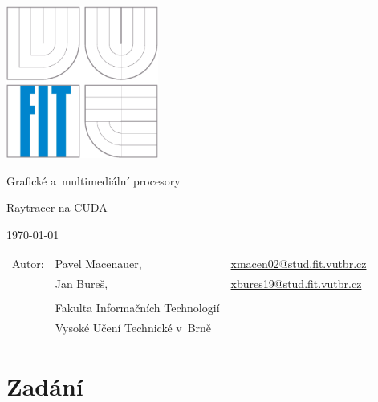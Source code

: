 \documentclass[12pt,a4paper,titlepage,final]{report}
\makeatletter
\newcommand\Course{Grafické a~multimediální procesory}
\newcommand\WorkTitle{Raytracer na CUDA}
\newcommand\AuthorA{Pavel Macenauer}
\newcommand\AuthorB{Jan Bureš}
\newcommand\AuthorAEmail{xmacen02@stud.fit.vutbr.cz}
\newcommand\AuthorBEmail{xbures19@stud.fit.vutbr.cz}
\newcommand\Faculty{Fakulta Informačních Technologií}
\newcommand\School{Vysoké Učení Technické v~Brně}
\makeatother
\begin{document}
	\begin{titlepage}
	\begin{center}
		\includegraphics[height=5cm]{images/logo.eps}
	\end{center}
	\vfill
	\begin{center}
		\begin{Large}
			\Course\\
		\end{Large}
		\bigskip
		\begin{Huge}
			\WorkTitle\\
		\end{Huge}
	\end{center}
	\vfill
	\begin{center}
		\begin{large}
			\today
		\end{large}
	\end{center}
	\vfill
	\begin{flushleft}
		\begin{large}
			\begin{tabular}{lll}
				Autor: & \AuthorA, & \url{\AuthorAEmail} \\
				& \AuthorB, & \url{\AuthorBEmail} \\
		
				& & \\
				& \Faculty \\
				& \School \\
			\end{tabular}
		\end{large}
	\end{flushleft}
\end{titlepage}		

\tableofcontents

\newpage

\section{Zadání}
\end{document}
